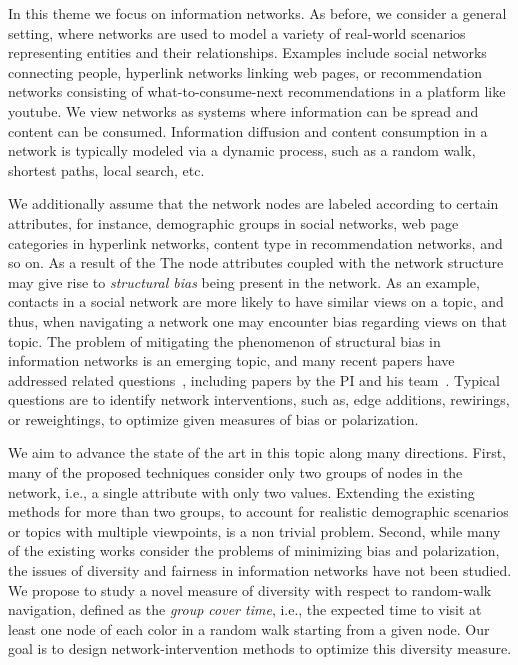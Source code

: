 \documentclass[a4paper,11pt]{article}
\begin{document}
In this theme we focus on information networks. 
As before, we consider a general setting, 
where networks are used to model a variety of real-world scenarios
representing entities and their relationships.
Examples include 
social networks connecting people, 
hyperlink networks linking web pages, or 
recommendation networks consisting of what-to-consume-next recommendations
in a platform like youtube.
We view networks as systems where information can be spread and content can be consumed. 
Information diffusion and content consumption in a network
is typically modeled via a dynamic process, such as a random walk, 
shortest paths, local search, etc.

We additionally assume that the network nodes are labeled according to certain attributes, 
for instance, demographic groups in social networks, 
web page categories in hyperlink networks, 
content type in recommendation networks, and so on.
As a result of the 
The node attributes coupled with the network structure may give rise to 
\emph{structural bias} being present in the network.
As an example, contacts in a social network are more likely to have similar views on a topic, 
and thus, when navigating a network one may encounter bias regarding views on that topic.
The problem of mitigating the phenomenon of structural bias in information networks is an emerging topic, 
and many recent papers have addressed related questions~\cite{fabbri2022rewiring,haddadan2022reducing}, 
including papers by the PI and his 
team~\cite{adriaens2022diameter,adriaens2023minimizing,cinus2023rebalancing,coupette2023reducing}.
Typical questions are to identify network interventions, 
such as, edge additions, re\-wirings, or re\-weightings, 
to optimize given measures of bias or polarization.

We aim to advance the state of the art in this topic
along many directions. 
First, many of the proposed techniques consider only two groups of nodes in the network, 
i.e., a single attribute with only two values.
Extending the existing methods for more than two groups, 
to account for realistic demographic scenarios or topics with multiple viewpoints, 
is a non trivial problem.
Second, while many of the existing works consider the problems of minimizing bias and polarization, 
the issues of diversity and fairness in information networks have not been studied.  
We propose to study a novel measure of diversity with respect to random-walk navigation, 
defined as the \emph{group cover time}, i.e., 
the expected time to visit at least one node of each color
in a random walk starting from a given node.
Our goal is to design network-intervention methods to 
optimize this diversity measure.
\end{document}
